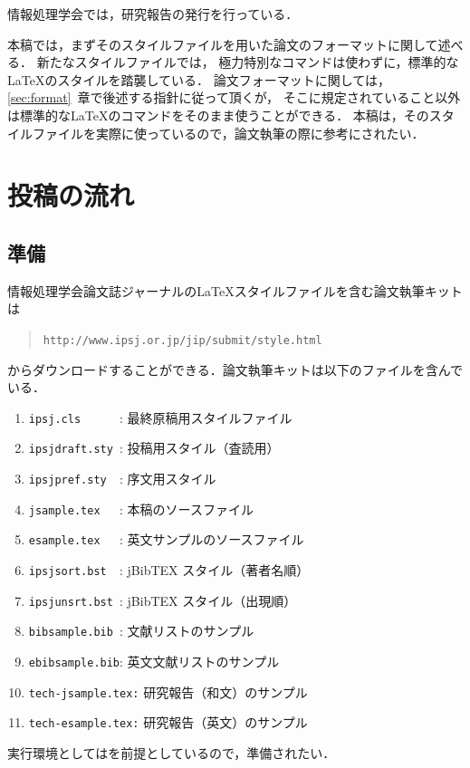 \documentclass[submit,ses,noauthor]{ipsj-lualatex}
\def\|{\verb|}
\begin{document}
情報処理学会では，研究報告の発行を行っている．

本稿では，まずそのスタイルファイルを用いた論文のフォーマットに関して述べる．
新たなスタイルファイルでは，
極力特別なコマンドは使わずに，標準的な\LaTeX のスタイルを踏襲している．
論文フォーマットに関しては，\ref{sec:format}~章で後述する指針に従って頂くが，
そこに規定されていること以外は標準的な\LaTeX のコマンドをそのまま使うことができる．
本稿は，そのスタイルファイルを実際に使っているので，論文執筆の際に参考にされたい．




%2
\section{投稿の流れ}


%2.1
\subsection{準備}

情報処理学会論文誌ジャーナルの\LaTeX スタイルファイルを含む論文執筆キットは
\begin{quote}
\small
\|http://www.ipsj.or.jp/jip/submit/style.html|
\end{quote}
からダウンロードすることができる．論文執筆キットは以下のファイルを含んで
いる．
\begin{enumerate}
\item \|ipsj.cls      |: 最終原稿用スタイルファイル
\item \|ipsjdraft.sty |: 投稿用スタイル（査読用）
\item \|ipsjpref.sty  |: 序文用スタイル
\item \|jsample.tex   |: 本稿のソースファイル
\item \|esample.tex   |: 英文サンプルのソースファイル
\item \|ipsjsort.bst  |: jBibTEX スタイル（著者名順）
\item \|ipsjunsrt.bst |: jBibTEX スタイル（出現順）
\item \|bibsample.bib |: 文献リストのサンプル
\item \|ebibsample.bib|: 英文文献リストのサンプル
\item \|tech-jsample.tex:| 研究報告（和文）のサンプル
\item \|tech-esample.tex:| 研究報告（英文）のサンプル
\end{enumerate}
実行環境としては\LaTeXe を前提としているので，準備されたい．
\end{document}
